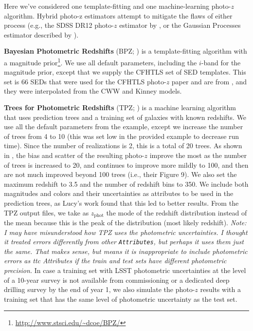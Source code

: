\documentclass[DM,lsstdraft,toc]{lsstdoc}
\begin{document}
Here we've considered one template-fitting and one machine-learning photo-$z$ algorithm. Hybrid photo-z estimators attempt to mitigate the flaws of either process (e.g., the SDSS DR12 photo-$z$ estimator by \citet{2016MNRAS.460.1371B}, or the Gaussian Processes estimator described by \citet{2017ApJ...838....5L}).

\textbf{Bayesian Photometric Redshifts} (BPZ; \citealt{2000ApJ...536..571B}) is a template-fitting algorithm with a magnitude prior\footnote{\url{http://www.stsci.edu/~dcoe/BPZ/}}. We use all default parameters, including the $i$-band for the magnitude prior, except that we supply the CFHTLS set of SED templates. This set is 66 SEDs that were used for the CFHTLS photo-$z$ paper and are from \cite{2006A&A...457..841I}, and they were interpolated from the CWW and Kinney models.

\textbf{Trees for Photometric Redshifts} (TPZ; \citealt{2013ascl.soft04011C,2013MNRAS.432.1483C}) is a machine learning algorithm that uses prediction trees and a training set of galaxies with known redshifts. We use all the default parameters from the example, except we increase the number of trees from 4 to 10 (this was set low in the provided example to decrease run time). Since the number of realizations is 2, this is a total of 20 trees. As shown in \cite{2013MNRAS.432.1483C}, the bias and scatter of the resulting photo-$z$ improve the most as the number of trees is increased to 20, and continues to improve more mildly to 100, and then are not much improved beyond 100 trees (i.e., their Figure 9). We also set the maximum redshift to 3.5 and the number of redshift bins to 350. We include both magnitudes and colors and their uncertainties as attributes to be used in the prediction trees, as Lucy's work found that this led to better results. From the TPZ output files, we take as $z_\mathrm{phot}$ the mode of the redshift distribution instead of the mean because this is the peak of the distribution (most likely redshift). \textit{Note: I may have misunderstood how TPZ uses the photometric uncertainties. I thought it treated errors differently from other \texttt{Attributes}, but perhaps it uses them just the same. That makes sense, but means it is inappropriate to include photometric errors as {ttc Attributes} if the train and test sets have different photometric precision.} In case a training set with LSST photometric uncertainties at the level of a 10-year survey is not available from commissioning or a dedicated deep drilling survey by the end of year 1, we also simulate the photo-$z$ results with a training set that has the same level of photometric uncertainty as the test set.
\end{document}
